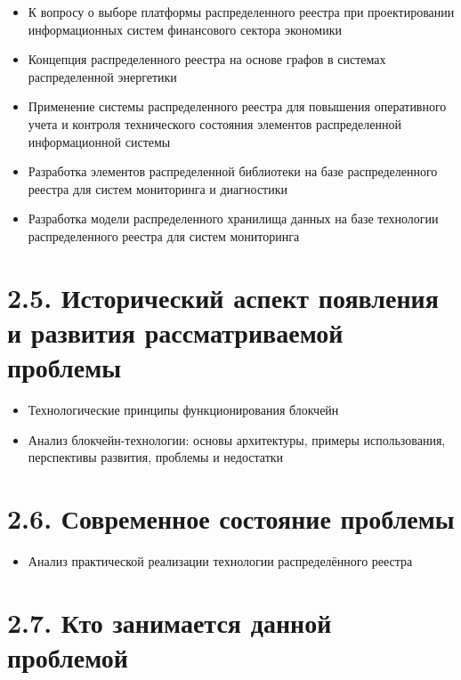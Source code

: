 \documentclass[a4paper, 12pt]{report}		%
\begin{document}
\begin{itemize}
\item К вопросу о выборе платформы распределенного реестра при проектировании информационных систем финансового сектора экономики
\item Концепция распределенного реестра на основе графов в системах распределенной энергетики
\item Применение системы распределенного реестра для повышения оперативного учета и контроля технического состояния элементов распределенной информационной системы
\item Разработка элементов распределенной библиотеки на базе распределенного реестра для систем мониторинга и диагностики
\item Разработка модели распределенного хранилища данных на базе технологии распределенного реестра для систем мониторинга
\end{itemize}


\section*{2.5. Исторический аспект появления и развития рассматриваемой проблемы}

\begin{itemize}
\item Технологические принципы функционирования блокчейн
\item Анализ блокчейн-технологии: основы архитектуры, примеры использования, перспективы развития, проблемы и недостатки
\end{itemize}

\section*{2.6. Современное состояние проблемы}

\begin{itemize}
\item Анализ практической реализации технологии распределённого реестра
\end{itemize}

\section*{2.7. Кто занимается данной проблемой}
\end{document}
